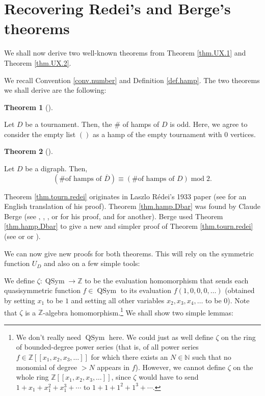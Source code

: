 \documentclass[numbers=enddot,12pt,final,onecolumn,notitlepage]{scrartcl}%
\numberwithin{exer}{section}
\theoremstyle{definition}
\newtheorem{theo}{Theorem}[section]
\newenvironment{theorem}[1][]
{\begin{theo}[#1]\begin{leftbar}}
{\end{leftbar}\end{theo}}
\begin{document}
\section{\label{sec.redei}Recovering Redei's and Berge's theorems}

We shall now derive two well-known theorems from Theorem \ref{thm.UX.1} and
Theorem \ref{thm.UX.2}.

We recall Convention \ref{conv.number} and Definition \ref{def.hamp}. The two
theorems we shall derive are the following:

\begin{theorem}
[R\'{e}dei's Theorem]\label{thm.tourn.redei}Let $D$ be a tournament. Then, the
\# of hamps of $D$ is odd. Here, we agree to consider the empty list $\left(
{}\right)  $ as a hamp of the empty tournament with $0$ vertices.
\end{theorem}

\begin{theorem}
[Berge's Theorem]\label{thm.hamp.Dbar}Let $D$ be a digraph. Then,%
\[
\left(  \text{\# of hamps of }\overline{D}\right)  \equiv\left(  \text{\# of
hamps of }D\right)  \operatorname{mod}2.
\]

\end{theorem}

Theorem \ref{thm.tourn.redei} originates in Laszlo R\'{e}dei's 1933 paper
\cite{Redei33} (see \cite[proof of Theorem 14]{Moon13} for an English
translation of his proof). Theorem \ref{thm.hamp.Dbar} was found by Claude
Berge (see \cite[\S 10.1, Theorem 1]{Berge76}, \cite[\S 10.1, Theorem
1]{Berge91}, \cite[solution to problem 7.8]{Tomesc85}, \cite[Exercise
5.19]{Lovasz07} or \cite[Theorem 1.3.6]{17s-lec7} for his proof, and
\cite[Corollaire 5.1]{Lass02} for another). Berge used Theorem
\ref{thm.hamp.Dbar} to give a new and simpler proof of Theorem
\ref{thm.tourn.redei} (see \cite[\S 10.2, Theorem 6]{Berge91} or
\cite[Exercise 5.20]{Lovasz07} or \cite[Theorem 1.6.1]{17s-lec7}).

We can now give new proofs for both theorems. This will rely on the symmetric
function $U_{D}$ and also on a few simple tools:

We define $\zeta:\operatorname*{QSym}\rightarrow\mathbb{Z}$ to be the
evaluation homomorphism that sends each quasisymmetric function $f\in
\operatorname*{QSym}$ to its evaluation $f\left(  1,0,0,0,\ldots\right)  $
(obtained by setting $x_{1}$ to be $1$ and setting all other variables
$x_{2},x_{3},x_{4},\ldots$ to be $0$). Note that $\zeta$ is a $\mathbb{Z}%
$-algebra homomorphism.\footnote{We don't really need $\operatorname*{QSym}$
here. We could just as well define $\zeta$ on the ring of bounded-degree power
series (that is, of all power series $f\in\mathbb{Z}\left[  \left[
x_{1},x_{2},x_{3},\ldots\right]  \right]  $ for which there exists an
$N\in\mathbb{N}$ such that no monomial of degree $>N$ appears in $f$).
However, we cannot define $\zeta$ on the whole ring $\mathbb{Z}\left[  \left[
x_{1},x_{2},x_{3},\ldots\right]  \right]  $, since $\zeta$ would have to send
$1+x_{1}+x_{1}^{2}+x_{1}^{3}+\cdots$ to $1+1+1^{2}+1^{3}+\cdots$.} We shall
show two simple lemmas:
\end{document}
